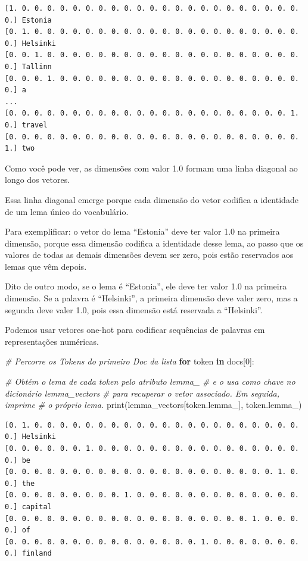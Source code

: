 \documentclass[
  brazilian,
]{article}
\newenvironment{Shaded}{}{}
\newcommand{\BuiltInTok}[1]{#1}
\newcommand{\CommentTok}[1]{\textcolor[rgb]{0.38,0.63,0.69}{\textit{#1}}}
\newcommand{\ControlFlowTok}[1]{\textcolor[rgb]{0.00,0.44,0.13}{\textbf{#1}}}
\newcommand{\DecValTok}[1]{\textcolor[rgb]{0.25,0.63,0.44}{#1}}
\newcommand{\KeywordTok}[1]{\textcolor[rgb]{0.00,0.44,0.13}{\textbf{#1}}}
\newcommand{\NormalTok}[1]{#1}
\begin{document}
\begin{verbatim}
[1. 0. 0. 0. 0. 0. 0. 0. 0. 0. 0. 0. 0. 0. 0. 0. 0. 0. 0. 0. 0. 0. 0. 0.] Estonia
[0. 1. 0. 0. 0. 0. 0. 0. 0. 0. 0. 0. 0. 0. 0. 0. 0. 0. 0. 0. 0. 0. 0. 0.] Helsinki
[0. 0. 1. 0. 0. 0. 0. 0. 0. 0. 0. 0. 0. 0. 0. 0. 0. 0. 0. 0. 0. 0. 0. 0.] Tallinn
[0. 0. 0. 1. 0. 0. 0. 0. 0. 0. 0. 0. 0. 0. 0. 0. 0. 0. 0. 0. 0. 0. 0. 0.] a
...
[0. 0. 0. 0. 0. 0. 0. 0. 0. 0. 0. 0. 0. 0. 0. 0. 0. 0. 0. 0. 0. 0. 1. 0.] travel
[0. 0. 0. 0. 0. 0. 0. 0. 0. 0. 0. 0. 0. 0. 0. 0. 0. 0. 0. 0. 0. 0. 0. 1.] two
\end{verbatim}

Como você pode ver, as dimensões com valor 1.0 formam uma linha diagonal
ao longo dos vetores.

Essa linha diagonal emerge porque cada dimensão do vetor codifica a
identidade de um lema único do vocabulário.

Para exemplificar: o vetor do lema ``Estonia'' deve ter valor 1.0 na
primeira dimensão, porque essa dimensão codifica a identidade desse
lema, ao passo que os valores de todas as demais dimensões devem ser
zero, pois estão reservados aos lemas que vêm depois.

Dito de outro modo, se o lema é ``Estonia'', ele deve ter valor 1.0 na
primeira dimensão. Se a palavra é ``Helsinki'', a primeira dimensão deve
valer zero, mas a segunda deve valer 1.0, pois essa dimensão está
reservada a ``Helsinki''.

Podemos usar vetores one-hot para codificar sequências de palavras em
representações numéricas.

\begin{Shaded}
\begin{Highlighting}[]
\CommentTok{\# Percorre os Tokens do primeiro Doc da lista}
\ControlFlowTok{for}\NormalTok{ token }\KeywordTok{in}\NormalTok{ docs[}\DecValTok{0}\NormalTok{]:}

    \CommentTok{\# Obtém o lema de cada token pelo atributo \textquotesingle{}lemma\_\textquotesingle{}}
    \CommentTok{\# e o usa como chave no dicionário \textquotesingle{}lemma\_vectors\textquotesingle{}}
    \CommentTok{\# para recuperar o vetor associado. Em seguida, imprime}
    \CommentTok{\# o próprio lema.}
    \BuiltInTok{print}\NormalTok{(lemma\_vectors[token.lemma\_], token.lemma\_)}
\end{Highlighting}
\end{Shaded}

\begin{verbatim}
[0. 1. 0. 0. 0. 0. 0. 0. 0. 0. 0. 0. 0. 0. 0. 0. 0. 0. 0. 0. 0. 0. 0. 0.] Helsinki
[0. 0. 0. 0. 0. 0. 1. 0. 0. 0. 0. 0. 0. 0. 0. 0. 0. 0. 0. 0. 0. 0. 0. 0.] be
[0. 0. 0. 0. 0. 0. 0. 0. 0. 0. 0. 0. 0. 0. 0. 0. 0. 0. 0. 0. 0. 1. 0. 0.] the
[0. 0. 0. 0. 0. 0. 0. 0. 0. 1. 0. 0. 0. 0. 0. 0. 0. 0. 0. 0. 0. 0. 0. 0.] capital
[0. 0. 0. 0. 0. 0. 0. 0. 0. 0. 0. 0. 0. 0. 0. 0. 0. 0. 0. 1. 0. 0. 0. 0.] of
[0. 0. 0. 0. 0. 0. 0. 0. 0. 0. 0. 0. 0. 0. 0. 1. 0. 0. 0. 0. 0. 0. 0. 0.] finland
\end{verbatim}
\end{document}
